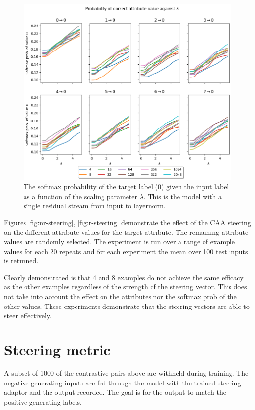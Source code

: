 \begin{figure}
    \centering
    \includegraphics[height=0.4\textheight]{figures/single-residual-steering.png}
    \caption{The softmax probability of the target label (0) given the input label as a function of the scaling parameter $\lambda$. This is the model with a single residual stream from input to layernorm.}
    \label{fig:sr-steering}
\end{figure}

Figures \ref{fig:nr-steering}, \ref{fig:r-steering} demonstrate the effect of the CAA steering on the different attribute values for the target attribute.
The remaining attribute values are randomly selected.
The experiment is run over a range of example values for each 20 repeats and for each experiment the mean over 100 test inputs is returned.

Clearly demonstrated is that 4 and 8 examples do not achieve the same efficacy as the other examples regardless of the strength of the steering vector.
This does not take into account the effect on the attributes nor the softmax prob of the other values.
These experiments demonstrate that the steering vectors are able to steer effectively.

\section{Steering metric}

A subset of 1000 of the contrastive pairs above are withheld during training.
The negative generating inputs are fed through the model with the trained steering adaptor and the output recorded.
The goal is for the output to match the positive generating labels.

